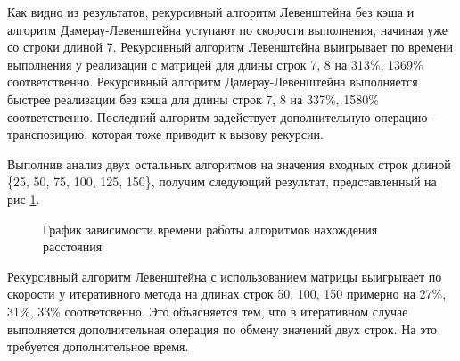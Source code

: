 Как видно из результатов, рекурсивный алгоритм Левенштейна без кэша и алгоритм Дамерау-Левенштейна уступают по скорости выполнения, начиная уже со строки длиной 7. Рекурсивный алгоритм Левенштейна выигрывает по времени выполнения у реализации с матрицей для длины строк 7, 8 на 313\%, 1369\% соответственно. Рекурсивный алгоритм Дамерау-Левенштейна выполняется быстрее реализации без кэша для длины строк 7, 8 на 337\%, 1580\% соответственно. Последний алгоритм задействует дополнительную операцию - транспозицию, которая тоже приводит к вызову рекурсии.

Выполнив анализ двух остальных алгоритмов на значения входных строк длиной \{25, 50, 75, 100, 125, 150\}, получим следующий результат, представленный на рис  \ref{fg:6_2}.
\begin{figure}[H]
	\centering
	\caption{График зависимости времени работы алгоритмов нахождения расстояния} 
	\label{fg:6_2}
\end{figure} 

Рекурсивный алгоритм Левенштейна с использованием матрицы выигрывает по скорости у итеративного метода на длинах строк 50, 100, 150 примерно на 27\%, 31\%, 33\% соответсвенно. Это объясняется тем, что в итеративном случае выполняется дополнительная операция по обмену значений двух строк. На это требуется дополнительное время.

